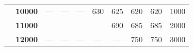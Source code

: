 \documentclass[12pt,a4paper,twoside,openright,titlepage,final]{article}
\begin{document}
\begin{table}[htbp!]
{\begin{tabular}{|cccccccccc|}
\multicolumn{1}{|c|}{}                               & \textbf{10000}        & ---           & ---           & ---           & 630           & 625           & 620           & 620                                                                 & 1000                                                                  \\
\multicolumn{1}{|c|}{}                               & \textbf{11000}        & ---           & ---           & ---           & ---           & 690           & 685           & 685                                                                 & 2000                                                                  \\
\multicolumn{1}{|c|}{}                               & \textbf{12000}        & ---           & ---           & ---           & ---           & ---           & 750           & 750                                                                 & 3000                                                                  \\ \hline
\end{tabular}
}
\end{table}
\end{document}
